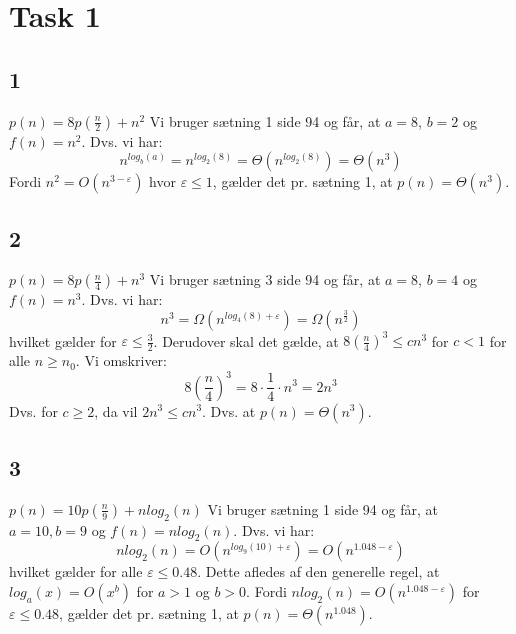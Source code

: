 \section{Task 1}

\subsection{1}

$p(n) = 8p(\frac{n}{2}) + n^2$
Vi bruger sætning 1 side 94 og får, at $a = 8$, $b = 2$ og $f(n) = n^2$.
Dvs. vi har:
$$n^{log_b(a)} = n^{log_2(8)} = \Theta(n^{log_2(8)}) = \Theta(n^3)$$
Fordi $n^2 = O(n^{3-\varepsilon})$ hvor $\varepsilon \leq 1$, gælder det pr. sætning 1, at $p(n) = \Theta(n^3)$.

\subsection{2}

$p(n) = 8p(\frac{n}{4}) + n^3$
Vi bruger sætning 3 side 94 og får, at $a = 8$, $b = 4$ og $f(n) = n^3$.
Dvs. vi har:
$$n^3 = \Omega(n^{log_4(8)+\varepsilon}) = \Omega(n^{\frac{3}{2}})$$
hvilket gælder for $\varepsilon \leq \frac{3}{2}$.
Derudover skal det gælde, at $8(\frac{n}{4})^3 \leq cn^3$ for $c < 1$ for alle $n \geq n_0$. Vi omskriver:
$$8(\frac{n}{4})^3 = 8 \cdot \frac{1}{4} \cdot n^3 = 2n^3$$
Dvs. for $c \geq 2$, da vil $2n^3 \leq cn^3$.
Dvs. at $p(n) = \Theta(n^3)$.

\subsection{3}

$p(n) = 10p(\frac{n}{9}) + nlog_2(n)$
Vi bruger sætning 1 side 94 og får, at $a = 10, b = 9$ og $f(n) = nlog_2(n)$.
Dvs. vi har:
$$nlog_2(n) = O(n^{log_9(10)+\varepsilon}) = O(n^{1.048 - \varepsilon})$$
hvilket gælder for alle $\varepsilon \leq 0.48$.
Dette afledes af den generelle regel, at $log_a(x) = O(x^b)$ for $a > 1$ og $b > 0$.
Fordi $nlog_2(n) = O(n^{1.048 - \varepsilon})$ for $\varepsilon \leq 0.48$, gælder det pr. sætning 1, at $p(n) = \Theta(n^{1.048})$.

